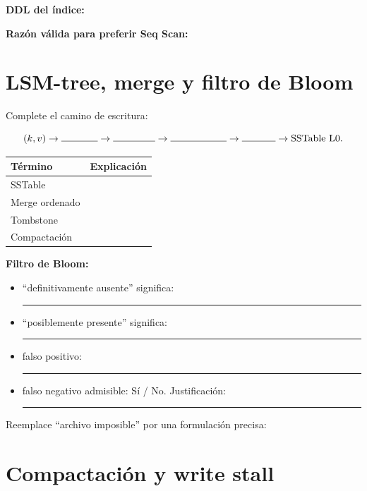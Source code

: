 \documentclass[variant=guia,cover=institutional,mode=print]{ua-engineering-v6-article}
\begin{document}
\textbf{DDL del índice:}

\vspace{1.1cm}

\textbf{Razón válida para preferir Seq Scan:}

\vspace{1.0cm}

\newpage
\section{LSM-tree, merge y filtro de Bloom}

Complete el camino de escritura:

\[
(k,v) \rightarrow \rule{1.3cm}{0.4pt} \rightarrow
\rule{1.5cm}{0.4pt} \rightarrow \rule{2.0cm}{0.4pt}
\rightarrow \rule{1.2cm}{0.4pt} \rightarrow \text{SSTable L0}.
\]

\begin{center}
\begin{tabular}{p{}p{}}
\toprule
Término & Explicación \\
\midrule
SSTable & \\[0.8cm]
Merge ordenado & \\[0.8cm]
Tombstone & \\[0.8cm]
Compactación & \\[0.8cm]
\bottomrule
\end{tabular}
\end{center}

\textbf{Filtro de Bloom:}

\begin{itemize}
\item ``definitivamente ausente'' significa: \rule{0.54\textwidth}{0.4pt}
\item ``posiblemente presente'' significa: \rule{0.54\textwidth}{0.4pt}
\item falso positivo: \rule{0.35\textwidth}{0.4pt}
\item falso negativo admisible: Sí / No. Justificación: \rule{0.33\textwidth}{0.4pt}
\end{itemize}

Reemplace ``archivo imposible'' por una formulación precisa:

\vspace{0.8cm}

\newpage
\section{Compactación y write stall}
\end{document}
